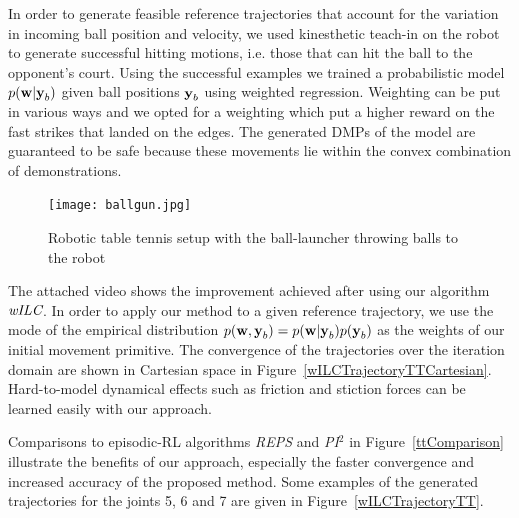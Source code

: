 In order to generate feasible reference trajectories that account for the variation in incoming ball position and velocity, we used kinesthetic teach-in on the robot to generate successful hitting motions, i.e. those that can hit the ball to the opponent's court. Using the successful examples we trained a probabilistic model $p(\boldsymbol{\mathrm{w}}|\boldsymbol{\mathrm{y}}_b)$ given ball positions $\boldsymbol{\mathrm{y}}_b$ using weighted regression. Weighting can be put in various ways and we opted for a weighting which put a higher reward on the fast strikes that landed on the edges. The generated DMPs of the model are guaranteed to be safe because these movements lie within the convex combination of demonstrations. 



\begin{figure}
\center
\texttt{[image: ballgun.jpg]}			
\caption{Robotic table tennis setup with the ball-launcher throwing balls to the robot}
\label{ballgun}
\end{figure}

The attached video shows the improvement achieved after using our algorithm $\emph{wILC}$. In order to apply our method to a given reference trajectory, we use the mode of the empirical distribution $p(\boldsymbol{\mathrm{w}},\boldsymbol{\mathrm{y}}_b) = p(\boldsymbol{\mathrm{w}}|\boldsymbol{\mathrm{y}}_b)p(\boldsymbol{\mathrm{y}}_b)$ as the weights of our initial movement primitive. The convergence of the trajectories over the iteration domain are shown in Cartesian space in Figure~\ref{wILCTrajectoryTTCartesian}. Hard-to-model dynamical effects such as friction and stiction forces can be learned easily with our approach.

Comparisons to episodic-RL algorithms \emph{REPS} and \emph{PI$^{2}$} in Figure~\ref{ttComparison} illustrate the benefits of our approach, especially the faster convergence and increased accuracy of the proposed method. Some examples of the generated trajectories for the joints 5, 6 and 7 are given in Figure~\ref{wILCTrajectoryTT}. 

